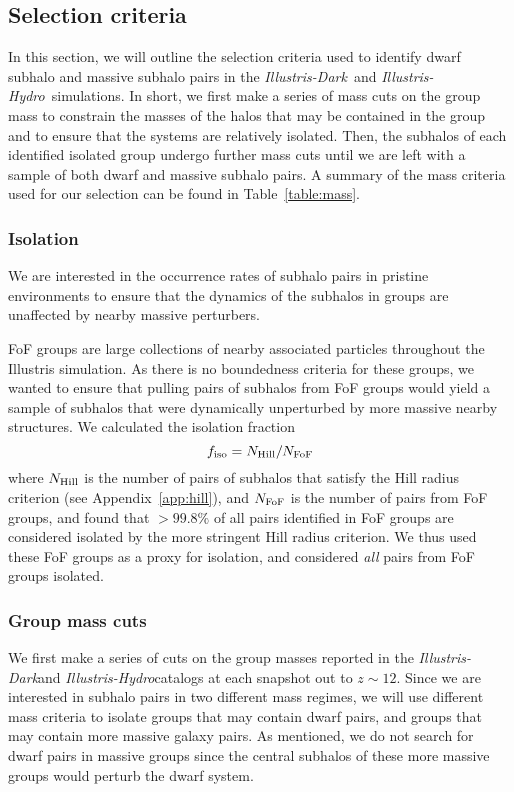 \documentclass[twocolumn]{aastex63}
\newcommand\ID{\textit{Illustris-Dark}}
\newcommand\IH{\textit{Illustris-Hydro}}
\begin{document}
\subsection{Selection criteria}\label{sec:selectionCrit}
In this section, we will outline the selection criteria used to identify dwarf subhalo and massive subhalo pairs in the \ID\ and \IH\ simulations. In short, we first make a series of mass cuts on the group mass to constrain the masses of the halos that may be contained in the group and to ensure that the systems are relatively isolated. Then, the subhalos of each identified isolated group undergo further mass cuts until we are left with a sample of both dwarf and massive subhalo pairs. A summary of the mass criteria used for our selection can be found in Table~\ref{table:mass}.

\subsubsection{Isolation}
We are interested in the occurrence rates of subhalo pairs in pristine environments to ensure that the dynamics of the subhalos in groups are unaffected by nearby massive perturbers. 

FoF groups are large collections of nearby associated particles throughout the Illustris simulation. As there is no boundedness criteria for these groups, we wanted to ensure that pulling pairs of subhalos from FoF groups would yield a sample of subhalos that were dynamically unperturbed by more massive nearby structures. We calculated the isolation fraction 
\begin{equation}
f_{\rm iso} = N_{\rm Hill} / N_{\rm FoF}
\end{equation}
where $N_{\rm Hill}$ is the number of pairs of subhalos that satisfy the Hill radius criterion (see Appendix~\ref{app:hill}), and $N_{\rm FoF}$ is the number of pairs from FoF groups, and found that $>99.8\%$ of all pairs identified in FoF groups are considered isolated by the more stringent Hill radius criterion. We thus used these FoF groups as a proxy for isolation, and considered \textit{all} pairs from FoF groups isolated.

\subsubsection{Group mass cuts}
We first make a series of cuts on the group masses reported in the \ID and \IH catalogs at each snapshot out to $z\sim12$. Since we are interested in subhalo pairs in two different mass regimes, we will use different mass criteria to isolate groups that may contain dwarf pairs, and groups that may contain more massive galaxy pairs. As mentioned, we do not search for dwarf pairs in massive groups 
since the central subhalos of these more massive groups would perturb the dwarf system. 
\end{document}
